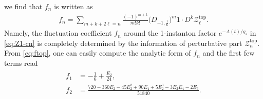 \documentclass[11pt]{article}
\newcommand{\Ztop}{\mathcal{Z}^{\text{top}}}
\renewcommand{\[}{\begin{eqnarray}}
\renewcommand{\]}{\end{eqnarray}}
\newcommand{\ftop}{f}
\begin{document}
we find that $\ftop_n$ is written as
\begin{align}
 \ftop_n=\sum_{m+k+2\ell=n}
  \frac{(-1)^{m+k}}{m!k!}\Big(D_{-1,\frac{1}{6}}\Big)^m 1\cdot D^k\Ztop_{\ell}.
\label{eq:ftop}
\end{align}
Namely, the fluctuation coefficient $f_n$
around the 1-instanton factor $e^{-A(t)/g_s}$
in \eqref{eq:Z1-cn} is completely determined by
the information of perturbative part $\Ztop_n$.
%
From \eqref{eq:ftop}, one can easily
compute the analytic form of $f_n$
and the first few terms read
%
\begin{align}
\begin{aligned}
 \ftop_1&=-\frac{1}{6}+\frac{E_2}{24},\\
 \ftop_2&=
 \frac{720-360E_2-45E_2^2+90E_4+5E_2^3-3E_2E_4-2E_6}{51840}.
\end{aligned}
\label{eq:ftop-ex}
\end{align}
%
\end{document}
